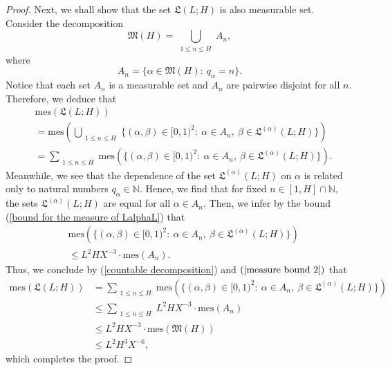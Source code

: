 \documentclass{amsart}%
\numberwithin{equation}{section}
\theoremstyle{remark}
\newcommand{\1}{\mathbbm{1}}
\begin{document}
\begin{proof}
    Next, we shall show that  the set $ \mathfrak{L}(L;H)$ is also measurable set. Consider the decomposition
    \begin{equation*}
        \mathfrak{M}(H)=\bigcup_{\substack{1\leq n\leq H}}A_{n},
    \end{equation*}
    where 
    \begin{equation*}
        A_{n}=\{\alpha\in \mathfrak{M}(H):\ q_{\alpha}=n\}.
    \end{equation*}
 Notice that each set $A_{n}$ is a measurable set and $A_{n}$ are pairwise disjoint for all $n$.
  Therefore, we deduce that
 \begin{equation}\label{countable decomposition}
 \begin{aligned}
     &\text{mes}\left(  \mathfrak{L}(L;H)\right)\\
     &=\text{mes}\left( \bigcup_{\substack{1\leq n\leq H}} \{(\alpha,\beta)\in [0,1)^2:\ \alpha\in A_n,\ \beta\in \mathfrak{L}^{(\alpha)}(L;H)\}\right)\\
     &=\sum_{\substack{1\leq n\leq H}}\text{mes}\left(\{(\alpha,\beta)\in [0,1)^2:\ \alpha\in  A_n,\ \beta\in \mathfrak{L}^{(\alpha)}(L;H)\}\right).
 \end{aligned}
 \end{equation}
 Meanwhile, we see that the dependence of the set $\mathfrak{L}^{(\alpha)}(L;H)$ on $\alpha$ is related only to natural numbers $q_{\alpha}\in \mathbb{N}$. Hence, we find that for fixed $n\in [1,H]\cap \mathbb{N}$, the sets $\mathfrak{L}^{(\alpha)}(L;H)$ are equal for all $\alpha\in A_{n}$. Then, we infer by the bound (\ref{bound for the measure of LalphaL}) that
 \begin{equation}\label{measure bound 2}
 \begin{aligned}
 &\text{mes}\left(\{(\alpha,\beta)\in [0,1)^2:\ \alpha\in A_n,\ \beta\in \mathfrak{L}^{(\alpha)}(L;H)\}\right)\\
     &\leq L^2HX^{-3}\cdot \text{mes}(A_{n}).
 \end{aligned}
 \end{equation}
 Thus, we conclude by (\ref{countable decomposition}) and $(\ref{measure bound 2})$ that 
 \begin{equation*}
 \begin{aligned}
   \text{mes}\left(  \mathfrak{L}(L;H)\right)&=\sum_{\substack{1\leq n\leq H}}\text{mes}\left(\{(\alpha,\beta)\in [0,1)^2:\ \alpha\in  A_n,\ \beta\in \mathfrak{L}^{(\alpha)}(L;H)\}\right)\\
     &\leq  \sum_{\substack{1\leq n\leq H}}L^2HX^{-3}\cdot \text{mes}(A_{n})\\
     &\leq L^2HX^{-3}\cdot \text{mes}(\mathfrak{M}(H))\\
     &\leq L^2H^3X^{-6},
 \end{aligned}
 \end{equation*}
 which completes the proof.
\end{proof}
\end{document}
